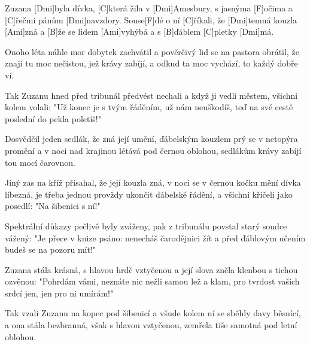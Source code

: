 
\sloka
Zuzana [Dmi]byla dívka, [C]která žila v [Dmi]Amesbury,
s jasnýma [F]očima a [C]řečmi pánům [Dmi]navzdory.
Souse[F]dé o ní [C]říkali, že [Dmi]temná kouzla [Ami]zná
a [B]že se lidem [Ami]vyhýbá a s [B]ďáblem [C]pletky [Dmi]má.

\sloka
Onoho léta náhle mor dobytek zachvátil
a pověrčivý lid se na pastora obrátil,
že znají tu moc nečistou, jež krávy zabíjí,
a odkud ta moc vychází, to každý dobře ví.

\sloka
Tak Zuzanu hned před tribunál předvést nechali
a když ji vedli městem, všichni kolem volali:
"Už konec je s tvým řáděním, už nám neuškodíš,
teď na své cestě poslední do pekla poletíš!"

\sloka
Dosvědčil jeden sedlák, že zná její umění,
ďábelským kouzlem prý se v netopýra promění
a v noci nad krajinou létává pod černou oblohou,
sedlákům krávy zabíjí tou mocí čarovnou.

\sloka
Jiný zas na kříž přísahal, že její kouzla zná,
v noci se v černou kočku mění dívka líbezná,
je třeba jednou provždy ukončit ďábelské řádění,
a všichni křičeli jako posedlí: "Na šibenici s ní!"

\sloka
Spektrální důkazy pečlivě byly zváženy,
pak z tribunálu povstal starý soudce vážený:
"Je přece v knize psáno: nenecháš čarodějnici žít
a před ďáblovým učením budeš se na pozoru mít!"

\sloka
Zuzana stála krásná, s hlavou hrdě vztyčenou
a její slova zněla klenbou s tichou ozvěnou:
"Pohrdám vámi, neznáte nic nežli samou lež a klam,
pro tvrdost vašich srdcí jen, jen pro ni umírám!"

\sloka
Tak vzali Zuzanu na kopec pod šibenicí
a všude kolem ní se sběhly davy běsnící,
a ona stála bezbranná, však s hlavou vztyčenou,
zemřela tiše samotná pod letní oblohou.
